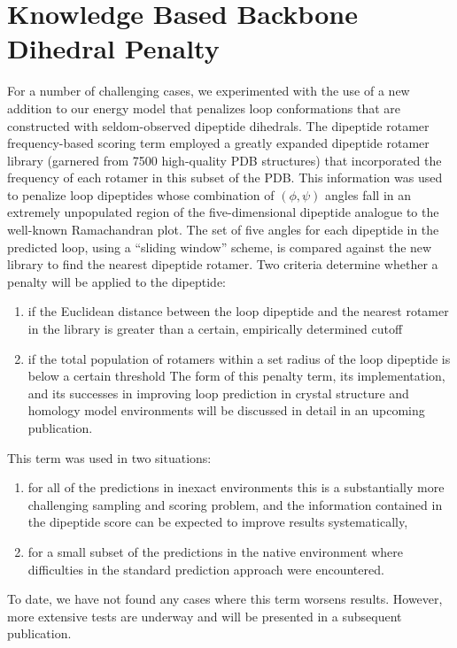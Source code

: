 \section{Knowledge Based Backbone Dihedral Penalty}
\label{section:unsorted/rfs}
For a number of challenging cases, we experimented with the use of a new addition to our energy model that penalizes loop conformations that are constructed with seldom-observed dipeptide dihedrals.
The dipeptide rotamer frequency-based scoring term employed a greatly expanded dipeptide rotamer library (garnered from {\textapprox}7500 high-quality PDB structures) that incorporated the frequency of each rotamer in this subset of the PDB.
This information was used to penalize loop dipeptides whose combination of $(\phi, \psi)$ angles fall in an extremely unpopulated region of the five-dimensional dipeptide analogue to the well-known Ramachandran plot.
The set of five angles for each dipeptide in the predicted loop, using a ``sliding window'' scheme, is compared against the new library to find the nearest dipeptide rotamer.
Two criteria determine whether a penalty will be applied to the dipeptide: 
\begin{enumerate}
\item if the Euclidean distance between the loop dipeptide and the nearest rotamer in the library is greater than a certain, empirically determined cutoff
\item if the total population of rotamers within a set radius of the loop dipeptide is below a certain threshold The form of this penalty term, its implementation, and its successes in improving loop prediction in crystal structure and homology model environments will be discussed in detail in an upcoming publication.
\end{enumerate}
This term was used in two situations:
\begin{enumerate}
\item for all of the predictions in inexact environments this is a substantially more challenging sampling and scoring problem, and the information contained in the dipeptide score can be expected to improve results systematically,
\item for a small subset of the predictions in the native environment where difficulties in the standard prediction approach were encountered.
\end{enumerate}
To date, we have not found any cases where this term worsens results.
However, more extensive tests are underway and will be presented in a subsequent publication.
